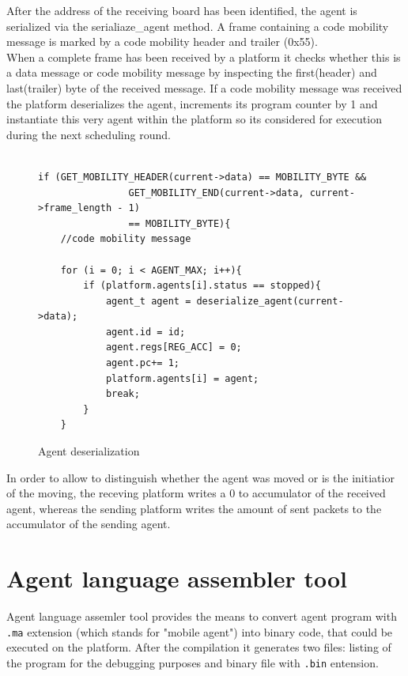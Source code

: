 \documentclass{scrreprt}
\begin{document}
After the address of the receiving board has been identified, the agent is serialized via the serialiaze_agent method. 
A frame containing a code mobility message is marked by a code mobility header and trailer (0x55).\\

\noindent
When a complete frame has been received by a platform it checks whether this is a data message or code mobility message
by inspecting the first(header) and last(trailer) byte of the received message. If a code mobility message was received
the platform deserializes the agent, increments its program counter by 1 and instantiate this very agent within the platform
so its considered for execution during the next scheduling round. \\

\begin{figure}[!htb]
\lstset{language=C, tabsize=2}
\begin{lstlisting}[frame=single]
	
if (GET_MOBILITY_HEADER(current->data) == MOBILITY_BYTE && 
				GET_MOBILITY_END(current->data, current->frame_length - 1)
				== MOBILITY_BYTE){
	//code mobility message

	for (i = 0; i < AGENT_MAX; i++){
		if (platform.agents[i].status == stopped){
			agent_t agent = deserialize_agent(current->data);
			agent.id = id;
			agent.regs[REG_ACC] = 0;
			agent.pc+= 1;
			platform.agents[i] = agent;
			break;
		}
	}

\end{lstlisting}
\caption{Agent deserialization}
\label{fig:agent-des}
\end{figure}


\noindent
In order to allow to distinguish whether the agent 
was moved or is the initiatior of the moving, the receving platform writes a 0 to accumulator of the received agent,
whereas the sending platform writes the amount of sent packets to the accumulator of the sending agent. 


\section{Agent language assembler tool}
Agent language assemler tool provides the means to convert agent program with \texttt{.ma} extension (which stands for "mobile agent")
into binary code, that could be executed on the platform.
After the compilation it generates two files: listing of the program for the debugging purposes and binary file with \texttt{.bin} entension.
\end{document}
